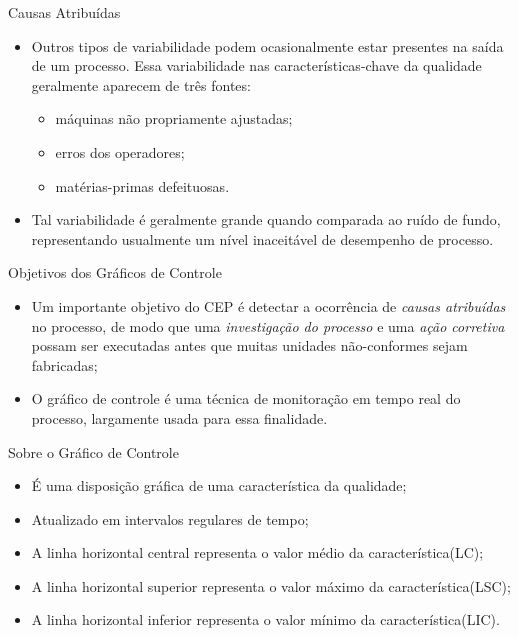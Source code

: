 \documentclass[12pt]{beamer}
\begin{document}
  \begin{frame}[t]{Causas Atribuídas}
    \begin{itemize}
      \item Outros tipos de variabilidade podem ocasionalmente estar presentes na saída de um processo. Essa variabilidade nas características-chave da qualidade geralmente aparecem de três fontes:

      \begin{itemize}
        \item máquinas não propriamente ajustadas;

        \item erros dos operadores;

        \item matérias-primas defeituosas.
      \end{itemize}

      \item Tal variabilidade é geralmente grande quando comparada ao ruído de fundo, representando usualmente um nível inaceitável de desempenho de processo.
    \end{itemize}
  \end{frame}

  \begin{frame}[t]{Objetivos dos Gráficos de Controle}
    \begin{itemize}
      \item Um importante objetivo do CEP é detectar a ocorrência de \emph{causas atribuídas} no processo, de modo que uma \emph{investigação do processo} e uma \emph{ação corretiva} possam ser executadas antes que muitas unidades não-conformes sejam fabricadas;

      \item O gráfico de controle é uma técnica de monitoração em tempo real do processo, largamente usada para essa finalidade.
    \end{itemize}
  \end{frame}

  \begin{frame}[t]{Sobre o Gráfico de Controle}
    \begin{itemize}
      \item É uma disposição gráfica de uma característica da qualidade;

      \item Atualizado em intervalos regulares de tempo;

      \item A linha horizontal central representa o valor médio da característica(LC);

      \item A linha horizontal superior representa o valor máximo da característica(LSC);

      \item A linha horizontal inferior representa o valor mínimo da característica(LIC).
    \end{itemize}
  \end{frame}
\end{document}
